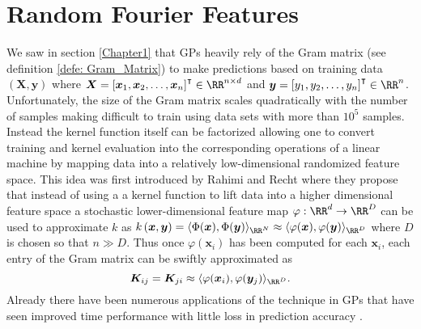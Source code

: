 \section{Random Fourier Features}\label{Chapter3}
We saw in section \ref{Chapter1} that GPs heavily rely of the Gram matrix (see definition \ref{defe: Gram_Matrix}) to make predictions based on training data $\left( \bm{X} , \bm{y} \right)$ where $\bm{X} = \left[ \bm{x}_1 , \bm{x}_2 , \ldots , \bm{x}_n \right]^{\intercal} \in \RR^{n \times d}$ and $\bm{y} = \left[ y_1 , y_2 , \ldots , y_n \right]^{\intercal} \in \RR^{n}$. Unfortunately, the size of the Gram matrix scales quadratically with the number of samples making difficult to train using data sets with more than $10^5$ samples. Instead the kernel function itself can be factorized allowing one to convert training and kernel evaluation into the corresponding operations of a linear machine by mapping data into a relatively low-dimensional randomized feature space. This idea was first introduced by Rahimi and Recht \cite{NIPS2007_013a006f} where they propose that instead of using a a kernel function to lift data into a higher dimensional feature space a stochastic lower-dimensional feature map $\varphi : \RR^d \to \RR^D$ can be used to approximate $k$ as $k \left( \bm{x} , \bm{y} \right) = \langle \Phi (\bm{x}) , \Phi (\bm{y}) \rangle_{\RR^N} \approx \langle \varphi (\bm{x}) , \varphi (\bm{y}) \rangle_{\RR^D}$ where $D$ is chosen so that $n \gg  D$. Thus once $\varphi (\bm{x}_i)$ has been computed for each $\bm{x}_i$, each entry of the Gram matrix can be swiftly approximated as
\[
    \bm{K}_{ij} = \bm{K}_{ji} \approx \langle \varphi (\bm{x}_i) , \varphi (\bm{y}_j) \rangle_{\RR^D}.
\]
Already there have been numerous applications of the technique in GPs that have seen improved time performance with little loss in prediction accuracy \cite{PotapczynskiAndres2021BSGP}.





